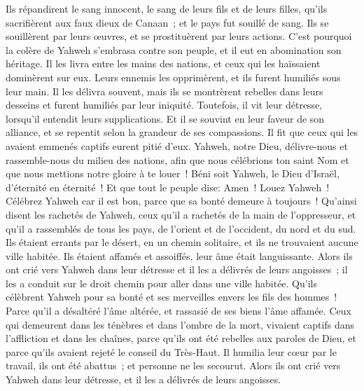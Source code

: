 \begin{multicols}{2}
Ils répandirent le sang innocent, le sang de leurs fils et de leurs filles, qu'ils sacrifièrent aux faux dieux de Canaan~; et le pays fut souillé de sang.
Ils se souillèrent par leurs œuvres, et se prostituèrent par leurs actions.
C'est pourquoi la colère de Yahweh s'embrasa contre son peuple, et il eut en abomination son héritage.
Il les livra entre les mains des nations, et ceux qui les haïssaient dominèrent sur eux.
Leurs ennemis les opprimèrent, et ils furent humiliés sous leur main.
Il les délivra souvent, mais ils se montrèrent rebelles dans leurs desseins et furent humiliés par leur iniquité.
Toutefois, il vit leur détresse, lorsqu'il entendit leurs supplications.
Et il se souvint en leur faveur de son alliance, et se repentit selon la grandeur de ses compassions.
Il fit que ceux qui les avaient emmenés captifs eurent pitié d'eux.
Yahweh, notre Dieu, délivre-nous et rassemble-nous du milieu des nations, afin que nous célébrions ton saint Nom et que nous mettions notre gloire à te louer~!
Béni soit Yahweh, le Dieu d'Israël, d'éternité en éternité~! Et que tout le peuple dise: Amen~! Louez Yahweh~!
\VerseOne{}Célébrez Yahweh car il est bon, parce que sa bonté demeure à toujours~!
Qu'ainsi disent les rachetés de Yahweh, ceux qu'il a rachetés de la main de l'oppresseur,
et qu'il a rassemblés de tous les pays, de l'orient et de l'occident, du nord et du sud.
Ils étaient errants par le désert, en un chemin solitaire, et ils ne trouvaient aucune ville habitée. 
Ils étaient affamés et assoiffés, leur âme était languissante.
Alors ils ont crié vers Yahweh dans leur détresse et il les a délivrés de leurs angoisses~;
il les a conduit sur le droit chemin pour aller dans une ville habitée.
Qu'ils célèbrent Yahweh pour sa bonté et ses merveilles envers les fils des hommes~!
Parce qu'il a désaltéré l'âme altérée, et rassasié de ses biens l'âme affamée.
Ceux qui demeurent dans les ténèbres et dans l'ombre de la mort, vivaient captifs dans l'affliction et dans les chaînes,
parce qu'ils ont été rebelles aux paroles de Dieu, et parce qu'ils avaient rejeté le conseil du Très-Haut.
Il humilia leur cœur par le travail, ils ont été abattus~; et personne ne les secourut.
Alors ils ont crié vers Yahweh dans leur détresse, et il les a délivrés de leurs angoisses.

\end{multicols}
